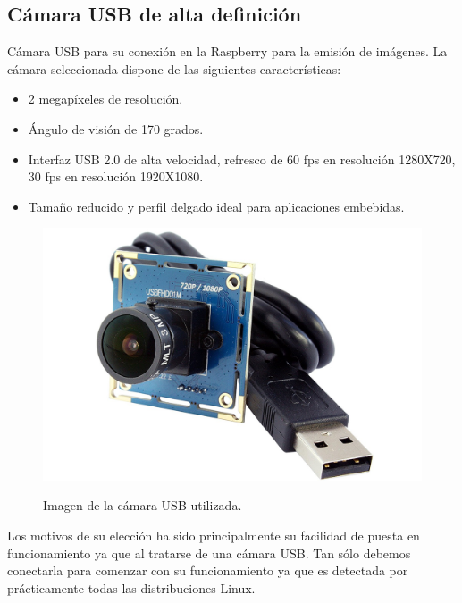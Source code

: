 \subsection{ Cámara USB de alta definición }

Cámara USB para su conexión en la Raspberry para la emisión de imágenes. La cámara seleccionada dispone de las siguientes características:

\begin{itemize}
\item 2 megapíxeles de resolución.
\item Ángulo de visión de 170 grados.
\item Interfaz USB 2.0 de alta velocidad, refresco de 60 fps en resolución 1280X720, 30 fps en resolución 1920X1080.
\item Tamaño reducido y perfil delgado ideal para aplicaciones embebidas.
\end{itemize}

\begin{figure}[H]
  \begin{center}
    \includegraphics[scale=0.15]{imagenes/robot/camara-usb.jpg}\\
    \caption{Imagen de la cámara USB utilizada.}
  \end{center}
\end{figure}

Los motivos de su elección ha sido principalmente su facilidad de puesta en funcionamiento ya que al tratarse de una cámara USB. Tan sólo debemos conectarla para comenzar con su funcionamiento ya que es detectada 
por prácticamente todas las distribuciones Linux.\\

